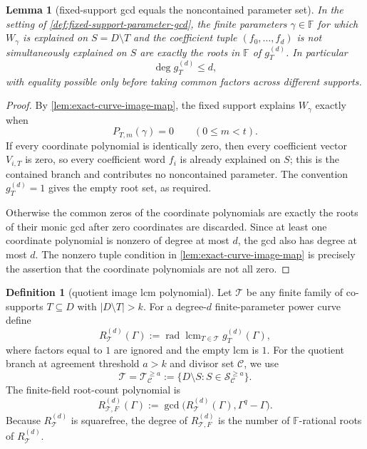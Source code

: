 \documentclass[11pt]{article}
\newtheorem{lemma}[lemma]{Lemma}
\theoremstyle{definition}
\newtheorem{definition}[definition]{Definition}
\theoremstyle{remark}
\newcommand{\F}{\mathbb{F}}
\begin{document}
\begin{lemma}[fixed-support gcd equals the noncontained parameter set]
\label{lem:fixed-support-gcd-exact}
In the setting of \cref{def:fixed-support-parameter-gcd}, the finite parameters
$\gamma\in\F$ for which $W_\gamma$ is explained on $S=D\setminus T$ and the
coefficient tuple $(f_0,\ldots,f_d)$ is not simultaneously explained on $S$ are
exactly the roots in $\F$ of $g_T^{(d)}$.  In particular
\[
        \deg g_T^{(d)}\le d,
\]
with equality possible only before taking common factors across different
supports.
\end{lemma}

\begin{proof}
By \cref{lem:exact-curve-image-map}, the fixed support explains $W_\gamma$ exactly
when
\[
        P_{T,m}(\gamma)=0\qquad(0\le m<t).
\]
If every coordinate polynomial is identically zero, then every coefficient
vector $V_{i,T}$ is zero, so every coefficient word $f_i$ is already explained on
$S$; this is the contained branch and contributes no noncontained parameter.
The convention $g_T^{(d)}=1$ gives the empty root set, as required.

Otherwise the common zeros of the coordinate polynomials are exactly the roots
of their monic gcd after zero coordinates are discarded.  Since at least one
coordinate polynomial is nonzero of degree at most $d$, the gcd also has degree
at most $d$.  The nonzero tuple condition in \cref{lem:exact-curve-image-map} is
precisely the assertion that the coordinate polynomials are not all zero.
\end{proof}

\begin{definition}[quotient image lcm polynomial]
\label{def:quotient-image-lcm-polynomial}
Let $\mathcal T$ be any finite family of co-supports $T\subseteq D$ with
$|D\setminus T|>k$.  For a degree-$d$ finite-parameter power curve define
\[
        R_{\mathcal T}^{(d)}(\Gamma)
        :=\operatorname{rad}\operatorname{lcm}_{T\in\mathcal T} g_T^{(d)}(\Gamma),
\]
where factors equal to $1$ are ignored and the empty lcm is $1$.  For the quotient branch at agreement
threshold $a>k$ and divisor set $\mathcal C$, we use
\[
        \mathcal T=\mathcal T_{\mathcal C}^{\ge a}
        :=\{D\setminus S:S\in\mathcal S_{\mathcal C}^{\ge a}\}.
\]
The finite-field root-count polynomial is
\[
        R_{\mathcal T,F}^{(d)}(\Gamma)
        :=\gcd\bigl(R_{\mathcal T}^{(d)}(\Gamma),\Gamma^q-\Gamma\bigr).
\]
Because $R_{\mathcal T}^{(d)}$ is squarefree, the degree of
$R_{\mathcal T,F}^{(d)}$ is the number of $\F$-rational roots of
$R_{\mathcal T}^{(d)}$.
\end{definition}
\end{document}
